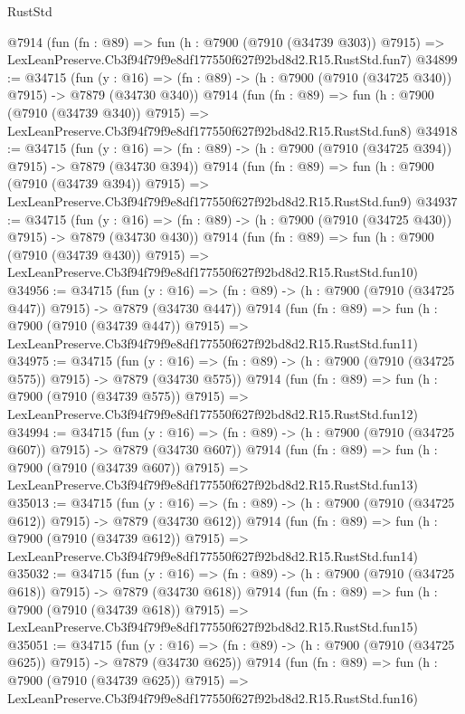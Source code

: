 \begin{lexlean}{RustStd}
\begin{coremodule}
    @7914
    (fun (fn : @89) =>
    fun (h : @7900 (@7910 (@34739 @303)) @7915) =>
    LexLeanPreserve.Cb3f94f79f9e8df177550f627f92bd8d2.R15.RustStd.fun7)
@34899 := @34715
    (fun (y : @16) => (fn : @89) -> (h : @7900 (@7910 (@34725 @340)) @7915) -> @7879 (@34730 @340))
    @7914
    (fun (fn : @89) =>
    fun (h : @7900 (@7910 (@34739 @340)) @7915) =>
    LexLeanPreserve.Cb3f94f79f9e8df177550f627f92bd8d2.R15.RustStd.fun8)
@34918 := @34715
    (fun (y : @16) => (fn : @89) -> (h : @7900 (@7910 (@34725 @394)) @7915) -> @7879 (@34730 @394))
    @7914
    (fun (fn : @89) =>
    fun (h : @7900 (@7910 (@34739 @394)) @7915) =>
    LexLeanPreserve.Cb3f94f79f9e8df177550f627f92bd8d2.R15.RustStd.fun9)
@34937 := @34715
    (fun (y : @16) => (fn : @89) -> (h : @7900 (@7910 (@34725 @430)) @7915) -> @7879 (@34730 @430))
    @7914
    (fun (fn : @89) =>
    fun (h : @7900 (@7910 (@34739 @430)) @7915) =>
    LexLeanPreserve.Cb3f94f79f9e8df177550f627f92bd8d2.R15.RustStd.fun10)
@34956 := @34715
    (fun (y : @16) => (fn : @89) -> (h : @7900 (@7910 (@34725 @447)) @7915) -> @7879 (@34730 @447))
    @7914
    (fun (fn : @89) =>
    fun (h : @7900 (@7910 (@34739 @447)) @7915) =>
    LexLeanPreserve.Cb3f94f79f9e8df177550f627f92bd8d2.R15.RustStd.fun11)
@34975 := @34715
    (fun (y : @16) => (fn : @89) -> (h : @7900 (@7910 (@34725 @575)) @7915) -> @7879 (@34730 @575))
    @7914
    (fun (fn : @89) =>
    fun (h : @7900 (@7910 (@34739 @575)) @7915) =>
    LexLeanPreserve.Cb3f94f79f9e8df177550f627f92bd8d2.R15.RustStd.fun12)
@34994 := @34715
    (fun (y : @16) => (fn : @89) -> (h : @7900 (@7910 (@34725 @607)) @7915) -> @7879 (@34730 @607))
    @7914
    (fun (fn : @89) =>
    fun (h : @7900 (@7910 (@34739 @607)) @7915) =>
    LexLeanPreserve.Cb3f94f79f9e8df177550f627f92bd8d2.R15.RustStd.fun13)
@35013 := @34715
    (fun (y : @16) => (fn : @89) -> (h : @7900 (@7910 (@34725 @612)) @7915) -> @7879 (@34730 @612))
    @7914
    (fun (fn : @89) =>
    fun (h : @7900 (@7910 (@34739 @612)) @7915) =>
    LexLeanPreserve.Cb3f94f79f9e8df177550f627f92bd8d2.R15.RustStd.fun14)
@35032 := @34715
    (fun (y : @16) => (fn : @89) -> (h : @7900 (@7910 (@34725 @618)) @7915) -> @7879 (@34730 @618))
    @7914
    (fun (fn : @89) =>
    fun (h : @7900 (@7910 (@34739 @618)) @7915) =>
    LexLeanPreserve.Cb3f94f79f9e8df177550f627f92bd8d2.R15.RustStd.fun15)
@35051 := @34715
    (fun (y : @16) => (fn : @89) -> (h : @7900 (@7910 (@34725 @625)) @7915) -> @7879 (@34730 @625))
    @7914
    (fun (fn : @89) =>
    fun (h : @7900 (@7910 (@34739 @625)) @7915) =>
    LexLeanPreserve.Cb3f94f79f9e8df177550f627f92bd8d2.R15.RustStd.fun16)

\end{coremodule}
\end{lexlean}
